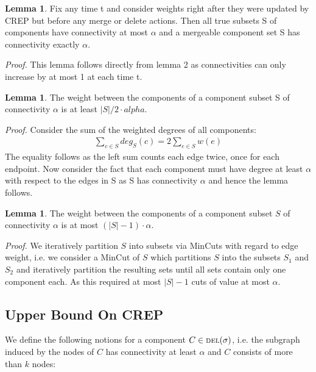 \documentclass[xcolor=dvipsnames, tikz, 12pt]{article}
\newcommand{\crep}{C{\scriptsize REP}}
\newcommand{\del}{\text{\scriptsize DEL}}
\theoremstyle{definition}
\newtheorem{lemma}[defi]{Lemma}
\begin{document}
\begin{lemma}
	\label{mergeable_lemma}
	Fix any time t and consider weights right after they were updated by \crep{} but before any merge or delete actions. Then all true subsets S of components have connectivity at most $\alpha$ and a mergeable component set S has connectivity exactly $\alpha$.
\end{lemma}

\textit{Proof.} This lemma follows directly from lemma 2 as connectivities can only increase by at most 1 at each time t.

\begin{lemma}
	\label{cut_lemma}
	The weight between the components of a component subset S of connectivity $\alpha$ is at least $|S|/2 \cdot alpha$.
\end{lemma}
\textit{Proof.} Consider the sum of the weighted degrees of all components:
\begin{align*}
\sum_{c\in S}deg_S(c)=2\sum_{e\in S}w(e)
\end{align*}
The equality follows as the left sum counts each edge twice, once for each endpoint.
Now consider the fact that each component must have degree at least $\alpha$ with respect to the edges in S as S has connectivity $\alpha$ and hence the lemma follows.

\begin{lemma}
	\label{cut_lemma_upper}
	The weight between the components of a component subset $S$ of connectivity $\alpha$ is at most $(|S|-1)\cdot\alpha$.
\end{lemma}
\textit{Proof.} We iteratively partition $S$ into subsets via MinCuts with regard to edge weight, i.e. we consider a MinCut of $S$ which partitions $S$ into the subsets $S_1$ and $S_2$ and iteratively partition the resulting sets until all sets contain only one component each. As this required at most $|S|-1$ cuts of value at most $\alpha$.

\subsection{Upper Bound On \crep{}}

We define the following notions for a component $C\in\del{}(\sigma)$, i.e. the subgraph induced by the nodes of $C$ has connectivity at least $\alpha$ and $C$ consists of more than $k$ nodes:
\end{document}
